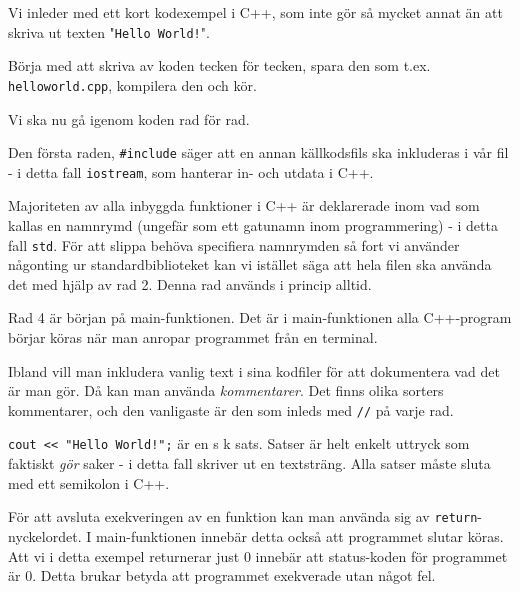 Vi inleder med ett kort kodexempel i C++, som inte gör så mycket annat än att skriva ut texten "\texttt{Hello World!}".



Börja med att skriva av koden tecken för tecken, spara den som t.ex. \texttt{helloworld.cpp}, kompilera den och kör.

Vi ska nu gå igenom koden rad för rad.

Den första raden, \texttt{\#include} säger att en annan källkodsfils ska inkluderas i vår fil - i detta fall \texttt{iostream}, som hanterar in- och utdata i C++.

Majoriteten av alla inbyggda funktioner i C++ är deklarerade inom vad som kallas en namnrymd (ungefär som ett gatunamn inom programmering) - i detta fall \texttt{std}. För att slippa behöva specifiera namnrymden så fort vi använder någonting ur standardbiblioteket kan vi istället säga att hela filen ska använda det med hjälp av rad 2. Denna rad används i princip alltid.

Rad 4 är början på main-funktionen. Det är i main-funktionen alla C++-program börjar köras när man anropar programmet från en terminal.

Ibland vill man inkludera vanlig text i sina kodfiler för att dokumentera vad det är man gör. Då kan man använda \emph{kommentarer}. Det finns olika sorters kommentarer, och den vanligaste är den som inleds med \texttt{//} på varje rad.

\texttt{cout << "Hello World!";} är en s k sats. Satser är helt enkelt uttryck som faktiskt \emph{gör} saker - i detta fall skriver ut en textsträng. Alla satser måste sluta med ett semikolon i C++.

För att avsluta exekveringen av en funktion kan man använda sig av \texttt{return}-nyckelordet. I main-funktionen innebär detta också att programmet slutar köras. Att vi i detta exempel returnerar just 0 innebär att status-koden för programmet är 0. Detta brukar betyda att programmet exekverade utan något fel.
